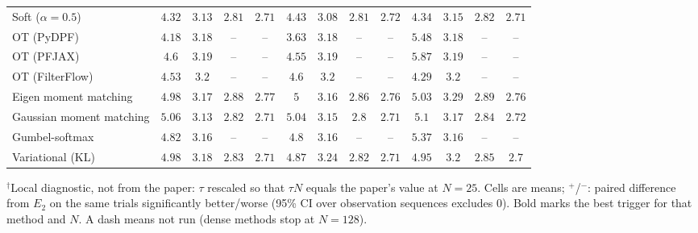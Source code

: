 \begin{table}[ht]
\begin{adjustbox}{max width=\linewidth}
\begin{tabular}{lcccc|cccc|cccc}
Soft ($\alpha{=}0.5$) & $\mathbf{4.32}$ & $3.13$ & $2.81$ & $2.71$ & $4.43$ & $\mathbf{3.08}$ & $\mathbf{2.81}$ & $2.72$ & $4.34$ & $3.15$ & $2.82$ & $\mathbf{2.71}$ \\
OT (PyDPF) & $4.18$ & $3.18$ & -- & -- & $\mathbf{3.63}$ & $3.18$ & -- & -- & $5.48$ & $\mathbf{3.18}$ & -- & -- \\
OT (PFJAX) & $4.6$ & $\mathbf{3.19}$ & -- & -- & $\mathbf{4.55}$ & $3.19$ & -- & -- & $5.87$ & $3.19$ & -- & -- \\
OT (FilterFlow) & $4.53$ & $3.2$ & -- & -- & $4.6$ & $3.2$ & -- & -- & $\mathbf{4.29}$ & $\mathbf{3.2}$ & -- & -- \\
Eigen moment matching & $\mathbf{4.98}$ & $3.17$ & $2.88$ & $2.77$ & $5$ & $\mathbf{3.16}$ & $\mathbf{2.86}$ & $\mathbf{2.76}$ & $5.03$ & $3.29$ & $2.89$ & $2.76$ \\
Gaussian moment matching & $5.06$ & $\mathbf{3.13}$ & $2.82$ & $2.71$ & $\mathbf{5.04}$ & $3.15$ & $\mathbf{2.8}$ & $\mathbf{2.71}$ & $5.1$ & $3.17$ & $2.84$ & $2.72$ \\
Gumbel-softmax & $4.82$ & $\mathbf{3.16}$ & -- & -- & $\mathbf{4.8}$ & $3.16$ & -- & -- & $5.37$ & $3.16$ & -- & -- \\
Variational (KL) & $4.98$ & $\mathbf{3.18}$ & $2.83$ & $2.71$ & $\mathbf{4.87}$ & $3.24$ & $\mathbf{2.82}$ & $2.71$ & $4.95$ & $3.2$ & $2.85$ & $\mathbf{2.7}$ \\
\bottomrule
\end{tabular}
\end{adjustbox}
\par\smallskip\parbox{0.95\linewidth}{\footnotesize $^\dagger$Local diagnostic, not from the paper: $\tau$ rescaled so that $\tau N$ equals the paper's value at $N{=}25$. Cells are means; $^{+}$/$^{-}$: paired difference from $E_2$ on the same trials significantly better/worse (95\% CI over observation sequences excludes 0). Bold marks the best trigger for that method and $N$. A dash means not run (dense methods stop at $N{=}128$).}
\end{table}

